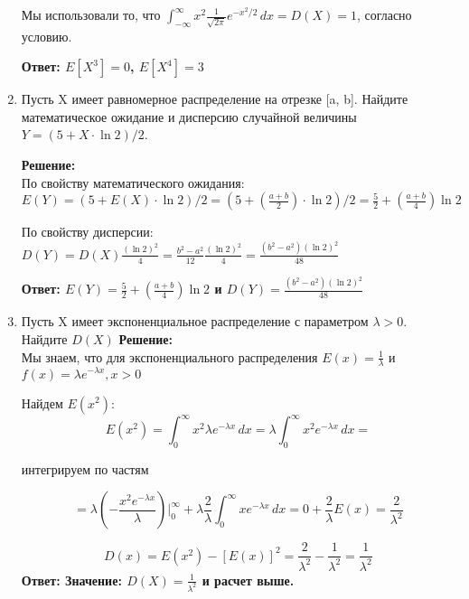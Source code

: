 \documentclass[a4paper,12pt]{article}
\begin{document}
\begin{enumerate}
Мы использовали то, что $\int_{-\infty}^{\infty}  x^2 \frac{1}{\sqrt{2 \pi}} e^{-x^2 /2  }\,dx=D(X)=1$, согласно условию.

\textbf{Ответ: $E[X^3]=0$, $E[X^4]=3$} 

\item Пусть X имеет равномерное распределение на отрезке [a, b]. Найдите математическое ожидание и дисперсию случайной величины $Y = (5 + X \cdot \ln{2})/2$.

\textbf{Решение:}\\
По свойству математического ожидания: $E(Y)=(5 + E(X) \cdot \ln{2})/2=(5 + (\frac{a+b}{2}) \cdot \ln{2})/2=\frac{5}{2}+(\frac{a+b}{4})  \ln{2}$

По свойству дисперсии: $D(Y)= D(X)\frac{(\ln{2})^2}{4}=\frac{b^2-a^2}{12}\frac{(\ln{2})^2}{4}=\frac{(b^2-a^2)(\ln{2})^2}{48}$


\textbf{Ответ: $E(Y) = \frac{5}{2}+(\frac{a+b}{4})  \ln{2}$ и $D(Y)=\frac{(b^2-a^2)(\ln{2})^2}{48}$ } 


\item Пусть X имеет экспоненциальное распределение с параметром $\lambda > 0$. Найдите $D(X)$
\textbf{Решение:}\\
Мы знаем, что для экспоненциального распределения $E(x) = \frac{1}{\lambda}$ и $f(x) = \lambda e^{-\lambda x}, x> 0$

Найдем $E(x^2)$:
$$E(x^2)=\int_{0}^{\infty} x^2 \lambda e^{-\lambda x}\,dx=\lambda \int_{0}^{\infty} x^2  e^{-\lambda x}\,dx=$$

интегрируем по частям

$$=\lambda (-\frac{x^2 e^{-\lambda x}}{\lambda}) \Big|_0^\infty+\lambda \frac{2}{\lambda} \int_{0}^{\infty} x  e^{-\lambda x}\,dx=0+\frac{2}{\lambda}E(x) = \frac{2}{\lambda^2}$$

$$D(x) = E(x^2)-[E(x)]^2 = \frac{2}{\lambda^2}-\frac{1}{\lambda^2}=\frac{1}{\lambda^2}$$
\textbf{Ответ: Значение: $D(X)=\frac{1}{\lambda^2}$ и расчет выше.} 

\end{enumerate}
\end{document}

